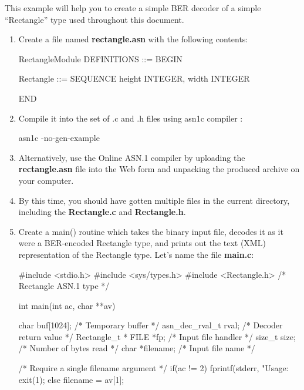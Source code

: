 \documentclass[english,oneside,12pt]{book}
\begin{document}
This example will help you to create a simple BER decoder of a simple
``Rectangle'' type used throughout this document.
\begin{enumerate}
\item Create a file named \textbf{rectangle.asn} with the following contents:

\begin{asn}
RectangleModule DEFINITIONS ::= BEGIN

Rectangle ::= SEQUENCE {
    height  INTEGER,
    width   INTEGER
}

END
\end{asn}
\item Compile it into the set of .c and .h files using asn1c compiler \cite{ASN1C}:

\begin{bash}
asn1c -no-gen-example %
\end{bash}
\item Alternatively, use the Online ASN.1 compiler \cite{AONL} by uploading
the \textbf{rectangle.asn} file into the Web form and unpacking the
produced archive on your computer.
\item By this time, you should have gotten multiple files in the current
directory, including the \textbf{Rectangle.c} and \textbf{Rectangle.h}.
\item Create a main() routine which takes the binary input file, decodes
it as it were a BER-encoded Rectangle type, and prints out the text
(XML) representation of the Rectangle type. Let's name the file \textbf{main.c}:

\begin{example}
#include <stdio.h>
#include <sys/types.h>
#include <Rectangle.h>   /* Rectangle ASN.1 type  */

int main(int ac, char **av) {
    char buf[1024];      /* Temporary buffer      */
    asn_dec_rval_t rval; /* Decoder return value  */
    Rectangle_t *%
    FILE *fp;            /* Input file handler    */
    size_t size;         /* Number of bytes read  */
    char *filename;      /* Input file name */

    /* Require a single filename argument */
    if(ac != 2) {
        fprintf(stderr, "Usage: %
        exit(1);
    } else {
        filename = av[1];
    }

}
\end{example}
\end{enumerate}
\end{document}

